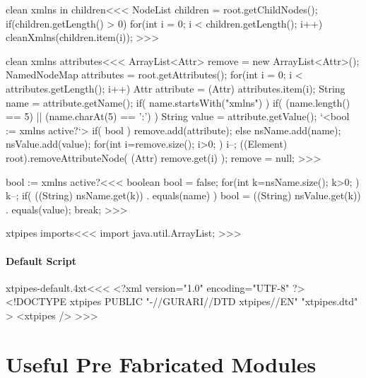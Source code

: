 \documentclass{article}
\begin{document}
 
 
\<clean xmlns in children\><<< 
NodeList children = root.getChildNodes();  
if(children.getLength() > 0) {  
   for(int i = 0; i < children.getLength(); i++) {  
      cleanXmlns(children.item(i));  
}  }  
>>> 
 
\<clean xmlns attributes\><<< 
ArrayList<Attr> remove = new ArrayList<Attr>();
NamedNodeMap attributes = root.getAttributes();  
for(int i = 0; i < attributes.getLength(); i++) {  
   Attr attribute = (Attr) attributes.item(i);  
   String name = attribute.getName();           
   if( name.startsWith("xmlns") ){     
     if( (name.length() == 5) || (name.charAt(5) == ':') ){
        String value = attribute.getValue();
        `<bool := xmlns active?`>
        if( bool ){ remove.add(attribute);
        } else { nsName.add(name); nsValue.add(value); }
}  } }   
for(int i=remove.size(); i>0; ){
   i--;
  ((Element) root).removeAttributeNode( (Attr) remove.get(i) );
}
remove = null;
>>> 

\<bool := xmlns active?\><<<
boolean bool = false;
for(int k=nsName.size(); k>0; ){ 
  k--;
  if( ((String) nsName.get(k)) . equals(name) ){
     bool = ((String) nsValue.get(k)) . equals(value);
     break;
} }
>>>

\<xtpipes imports\><<<
import java.util.ArrayList;
>>>



\subsection{Default Script}



\expandafter\AddFile{}



\<xtpipes-default.4xt\><<<
<?xml version="1.0" encoding="UTF-8" ?>
<!DOCTYPE xtpipes PUBLIC "-//GURARI//DTD xtpipes//EN" "xtpipes.dtd"  >
<xtpipes />
>>>












\part{Useful Pre Fabricated Modules}
\end{document}
